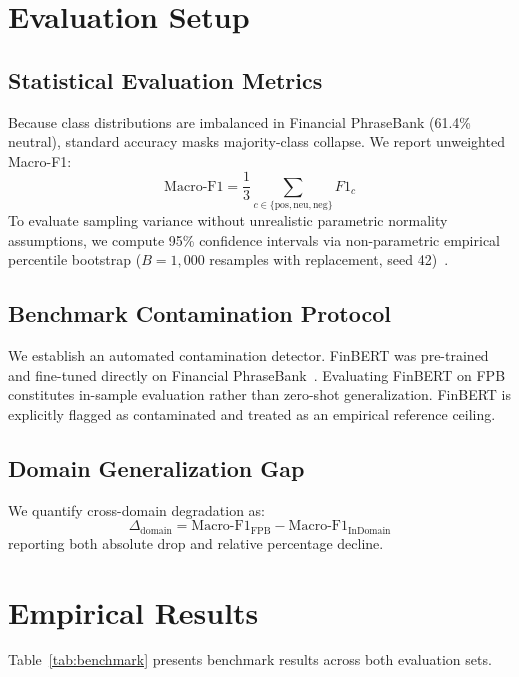 \documentclass[10pt,twocolumn,letterpaper]{article}
\begin{document}
\section{Evaluation Setup}

\subsection{Statistical Evaluation Metrics}
Because class distributions are imbalanced in Financial PhraseBank (61.4\% neutral), standard accuracy masks majority-class collapse. We report unweighted Macro-F1:
\begin{equation}
    \text{Macro-F1} = \frac{1}{3} \sum_{c \in \{\text{pos}, \text{neu}, \text{neg}\}} F1_c
\end{equation}
To evaluate sampling variance without unrealistic parametric normality assumptions, we compute 95\% confidence intervals via non-parametric empirical percentile bootstrap ($B=1,000$ resamples with replacement, seed 42)~\cite{efron1993bootstrap}.

\subsection{Benchmark Contamination Protocol}
We establish an automated contamination detector. FinBERT was pre-trained and fine-tuned directly on Financial PhraseBank~\cite{araci2019finbert}. Evaluating FinBERT on FPB constitutes in-sample evaluation rather than zero-shot generalization. FinBERT is explicitly flagged as contaminated and treated as an empirical reference ceiling.

\subsection{Domain Generalization Gap}
We quantify cross-domain degradation as:
\begin{equation}
    \Delta_{\text{domain}} = \text{Macro-F1}_{\text{FPB}} - \text{Macro-F1}_{\text{InDomain}}
\end{equation}
reporting both absolute drop and relative percentage decline.



\section{Empirical Results}

Table~\ref{tab:benchmark} presents benchmark results across both evaluation sets.
\end{document}
